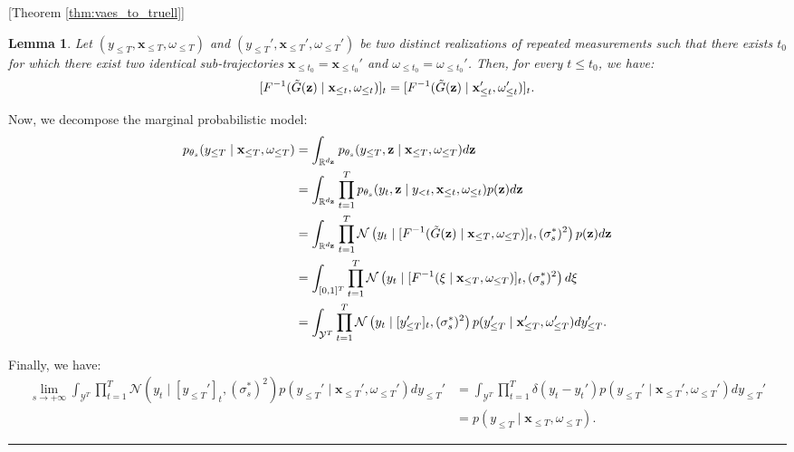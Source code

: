 \documentclass[10pt]{article} %
\newcommand{\BlackBox}{\rule{1.5ex}{1.5ex}}  %
\renewenvironment{proof}{\par\noindent{\bf Proof\ }}{\hfill\BlackBox\\[2mm]}
\newenvironment{proof}{\par\noindent{\bf Proof\ }}{\hfill\BlackBox\\[2mm]}
\newtheorem{lemma}[theorem]{Lemma}
\begin{document}
\begin{proof}[Theorem \ref{thm:vaes_to_truell}]
\begin{lemma}
Let \( (y_{\leq T}, \mathbf{x}_{\leq T}, \omega_{\leq T}) \) and \( (y_{\leq T}', \mathbf{x}_{\leq T}', \omega_{\leq T}') \) be two distinct realizations of repeated measurements such that there exists $t_0$ for which there exist two identical sub-trajectories \( \mathbf{x}_{\leq t_0} = \mathbf{x}_{\leq t_0}' \) and \( \omega_{\leq t_0} = \omega_{\leq t_0}' \). Then, for every \( t \leq t_0 \), we have:
\[
[F^{-1}(\Tilde{G}(\mathbf{z}) \mid \mathbf{x}_{\leq t}, \omega_{\leq t})]_t = [F^{-1}(\Tilde{G}(\mathbf{z}) \mid \mathbf{x}_{\leq t}', \omega_{\leq t}')]_t.
\]
\end{lemma}

Now, we decompose the marginal probabilistic model:
\begin{equation*}
    \begin{split}
        p_{\theta_s}(y_{\leq T} \mid \mathbf{x}_{\leq T}, \omega_{\leq T}) &= \int_{\mathbb{R}^{d_{\mathbf{z}}}} p_{\theta_s}(y_{\leq T}, \mathbf{z} \mid \mathbf{x}_{\leq T}, \omega_{\leq T}) d\mathbf{z} \\
        &= \int_{\mathbb{R}^{d_{\mathbf{z}}}} \prod_{t=1}^T p_{\theta_s}(y_{t}, \mathbf{z} \mid y_{<t}, \mathbf{x}_{\leq t}, \omega_{\leq t}) p(\mathbf{z}) d\mathbf{z} \\
        &= \int_{\mathbb{R}^{d_{\mathbf{z}}}} \prod_{t=1}^T \mathcal{N}\left( y_t \mid [F^{-1}(\Tilde{G}(\mathbf{z}) \mid \mathbf{x}_{\leq T}, \omega_{\leq T})]_t, (\sigma_{s}^*)^2 \right) p(\mathbf{z}) d\mathbf{z} \\
        &= \int_{[0,1]^{T}} \prod_{t=1}^T \mathcal{N}\left( y_t \mid [F^{-1}(\xi \mid \mathbf{x}_{\leq T}, \omega_{\leq T})]_t, (\sigma_{s}^*)^2 \right) d\mathbf{\xi}\\
        &= \int_{\mathcal{Y}^{T}} \prod_{t=1}^T \mathcal{N}\left( y_t \mid [y_{\leq T}']_t, (\sigma_{s}^*)^2 \right) p(y_{\leq T}' \mid \mathbf{x}_{\leq T}', \omega_{\leq T}') dy_{\leq T}'.
    \end{split}
\end{equation*}

Finally, we have:
\begin{equation*}
\begin{split}
    \lim_{s \to +\infty} \int_{\mathcal{Y}^{T}} \prod_{t=1}^T \mathcal{N}\left( y_t \mid [y_{\leq T}']_t, (\sigma_{s}^*)^2 \right) p(y_{\leq T}' \mid \mathbf{x}_{\leq T}', \omega_{\leq T}') dy_{\leq T}' 
&= \int_{\mathcal{Y}^{T}} \prod_{t=1}^T \delta(y_t - y_t') p(y_{\leq T}' \mid \mathbf{x}_{\leq T}', \omega_{\leq T}') dy_{\leq T}'\\
&= p(y_{\leq T} \mid \mathbf{x}_{\leq T}, \omega_{\leq T}).
\end{split}
\end{equation*}


\end{proof}
\end{document}
